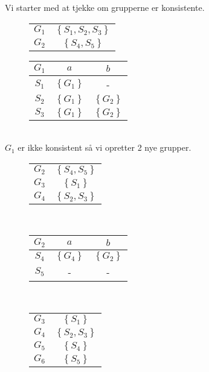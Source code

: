 \documentclass[11pt,a4paper]{article}
\begin{document}
Vi starter med at tjekke om grupperne er konsistente.
\begin{figure}[!ht]\label{fig:mindfa:gs}
  \centering
  \begin{tabular}{c|c}
    $G_1$ & $\left\{S_1, S_2, S_3\right\}$\\
    $G_2$ & $\left\{S_4, S_5\right\}$
  \end{tabular}
\end{figure}
\begin{figure}[!ht]\label{fig:mindfa:g1}
  \centering
  \begin{tabular}{c|cc}
    $G_1$ & $a$ & $b$\\\hline
    $S_1$ & $\left\{G_1\right\}$ & -\\
    $S_2$ & $\left\{G_1\right\}$ & $\left\{G_2\right\}$\\
    $S_3$ & $\left\{G_1\right\}$ & $\left\{G_2\right\}$
  \end{tabular}
\end{figure}\\
$G_1$ er ikke konsistent så vi opretter 2 nye grupper.
\begin{figure}[!ht]\label{fig:mindfa:newgs}
  \centering
  \begin{tabular}{c|c}
    $G_2$ & $\left\{S_4, S_5\right\}$\\
    $G_3$ & $\left\{S_1\right\}$\\
    $G_4$ & $\left\{S_2, S_3\right\}$
  \end{tabular}
\end{figure}\\
\begin{figure}[!ht]\label{fig:mindfa:g2}
  \centering
  \begin{tabular}{c|cc}
    $G_2$ & $a$ & $b$\\\hline
    $S_4$ & $\left\{G_4\right\}$ & $\left\{G_2\right\}$ \\
    $S_5$ & - & -
  \end{tabular}
\end{figure}\\
\begin{figure}[!ht]\label{fig:mindfa:newgs}
  \centering
  \begin{tabular}{c|c}
    $G_3$ & $\left\{S_1\right\}$\\
    $G_4$ & $\left\{S_2, S_3\right\}$\\
    $G_5$ & $\left\{S_4\right\}$\\
    $G_6$ & $\left\{S_5\right\}$
  \end{tabular}
\end{figure}\\
\end{document}
